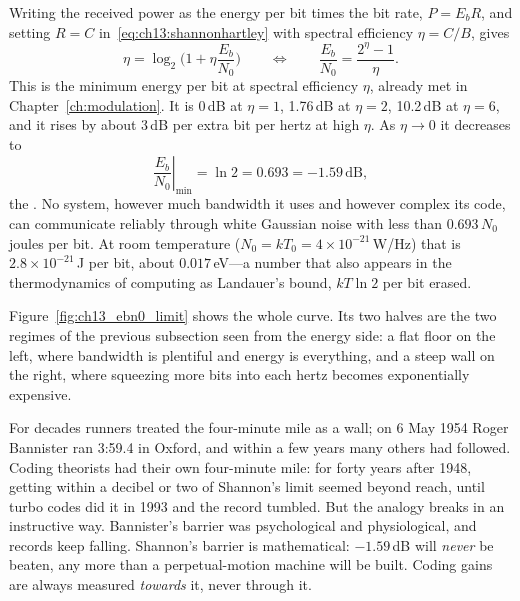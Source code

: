 Writing the received power as the energy per bit times the bit rate, $P=E_bR$, and setting $R=C$
in~\eqref{eq:ch13:shannonhartley} with spectral efficiency $\eta=C/B$, gives
\begin{equation}
\eta=\log_2\!\Big(1+\eta\frac{E_b}{N_0}\Big)
\qquad\Longleftrightarrow\qquad
\frac{E_b}{N_0}=\frac{2^\eta-1}{\eta}.
\label{eq:ch13:ebn0}
\end{equation}
This is the minimum energy per bit at spectral efficiency $\eta$, already met in
Chapter~\ref{ch:modulation}. It is 0\,dB at $\eta=1$, 1.76\,dB at $\eta=2$, 10.2\,dB at
$\eta=6$, and it rises by about 3\,dB per extra bit per hertz at high $\eta$. As $\eta\to0$ it
decreases to
\begin{equation}
\left.\frac{E_b}{N_0}\right|_{\min}=\ln2=0.693=-1.59\,\text{dB},
\label{eq:ch13:limit}
\end{equation}
the . No system, however much bandwidth it uses and however complex its code,
can communicate reliably through white Gaussian noise with less than $0.693\,N_0$ joules per bit.
At room temperature ($N_0=kT_0=4\times10^{-21}$\,W/Hz) that is $2.8\times10^{-21}$\,J per bit,
about $0.017$\,eV---a number that also appears in the thermodynamics of computing as Landauer's
bound, $kT\ln2$ per bit erased.

Figure~\ref{fig:ch13_ebn0_limit} shows the whole curve. Its two halves are the two regimes of the
previous subsection seen from the energy side: a flat floor on the left, where bandwidth is
plentiful and energy is everything, and a steep wall on the right, where squeezing more bits into
each hertz becomes exponentially expensive.

\begin{analogy}
For decades runners treated the four-minute mile as a wall; on 6 May 1954 Roger Bannister ran
3:59.4 in Oxford, and within a few years many others had followed. Coding theorists had their own
four-minute mile: for forty years after 1948, getting within a decibel or two of Shannon's limit
seemed beyond reach, until turbo codes did it in 1993 and the record tumbled. But the analogy
breaks in an instructive way. Bannister's barrier was psychological and physiological, and
records keep falling. Shannon's barrier is mathematical: $-1.59$\,dB will \emph{never} be beaten,
any more than a perpetual-motion machine will be built. Coding gains are always measured
\emph{towards} it, never through it.
\end{analogy}

